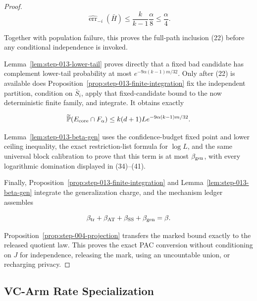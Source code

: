\begin{proof}
\[
 \widehat{\operatorname{err}}_{-i}(\bar H)
 \leq\frac{k}{k-1}\frac\alpha8\leq\frac\alpha4.
\]

Together with population failure, this proves the full-path inclusion (22)
before any conditional independence is invoked.

Lemma~\ref{lem:step-013-lower-tail} proves directly that a fixed bad
candidate has complement lower-tail probability at most
\(e^{-9\alpha(k-1)m/32}\). Only after (22) is available does
Proposition~\ref{prop:step-013-finite-integration} fix the independent
partition, condition on \(\bar S_i\), apply that fixed-candidate bound to
the now deterministic finite family, and integrate. It obtains exactly

\[
 \widetilde{\mathbb P}(E_{\rm core}\cap F_\alpha)
 \leq k(d+1)L e^{-9\alpha(k-1)m/32}.
\]

Lemma~\ref{lem:step-013-beta-gen} uses the confidence-budget fixed point and
lower ceiling inequality, the exact restriction-list formula for \(\log L\), and
the same universal block calibration to prove that this term is at most
\(\beta_{\rm gen}\), with every logarithmic domination displayed in
(34)--(41).

Finally, Proposition~\ref{prop:step-013-finite-integration} and
Lemma~\ref{lem:step-013-beta-gen} integrate the generalization charge, and
the mechanism ledger assembles

\[
 \beta_{\rm tr}+\beta_{\rm AT}+\beta_{\rm SS}+\beta_{\rm gen}=\beta.
\]

Proposition~\ref{prop:step-004-projection} transfers the marked
bound exactly to the released quotient law. This proves the exact PAC
conversion without conditioning on \(J\) for independence, releasing the
mark, using an uncountable union, or recharging privacy.



\end{proof}

\subsection{VC-Arm Rate Specialization}\label{app:step_014}

